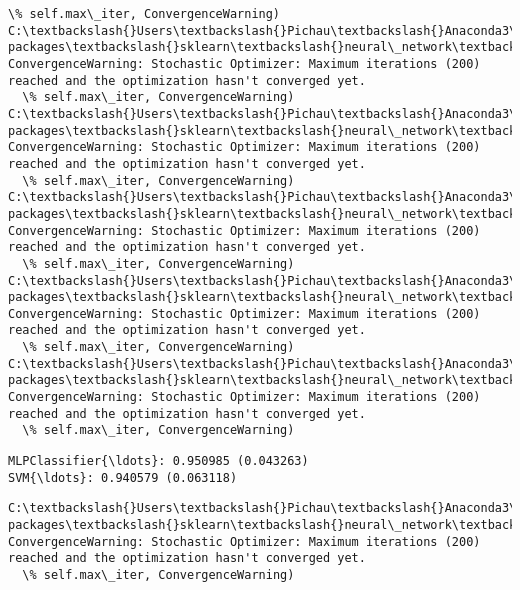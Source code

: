 \documentclass[11pt]{article}
\begin{document}
\begin{Verbatim}[commandchars=\\\{\}]
  \% self.max\_iter, ConvergenceWarning)
C:\textbackslash{}Users\textbackslash{}Pichau\textbackslash{}Anaconda3\textbackslash{}lib\textbackslash{}site-packages\textbackslash{}sklearn\textbackslash{}neural\_network\textbackslash{}multilayer\_perceptron.py:564: ConvergenceWarning: Stochastic Optimizer: Maximum iterations (200) reached and the optimization hasn't converged yet.
  \% self.max\_iter, ConvergenceWarning)
C:\textbackslash{}Users\textbackslash{}Pichau\textbackslash{}Anaconda3\textbackslash{}lib\textbackslash{}site-packages\textbackslash{}sklearn\textbackslash{}neural\_network\textbackslash{}multilayer\_perceptron.py:564: ConvergenceWarning: Stochastic Optimizer: Maximum iterations (200) reached and the optimization hasn't converged yet.
  \% self.max\_iter, ConvergenceWarning)
C:\textbackslash{}Users\textbackslash{}Pichau\textbackslash{}Anaconda3\textbackslash{}lib\textbackslash{}site-packages\textbackslash{}sklearn\textbackslash{}neural\_network\textbackslash{}multilayer\_perceptron.py:564: ConvergenceWarning: Stochastic Optimizer: Maximum iterations (200) reached and the optimization hasn't converged yet.
  \% self.max\_iter, ConvergenceWarning)
C:\textbackslash{}Users\textbackslash{}Pichau\textbackslash{}Anaconda3\textbackslash{}lib\textbackslash{}site-packages\textbackslash{}sklearn\textbackslash{}neural\_network\textbackslash{}multilayer\_perceptron.py:564: ConvergenceWarning: Stochastic Optimizer: Maximum iterations (200) reached and the optimization hasn't converged yet.
  \% self.max\_iter, ConvergenceWarning)
C:\textbackslash{}Users\textbackslash{}Pichau\textbackslash{}Anaconda3\textbackslash{}lib\textbackslash{}site-packages\textbackslash{}sklearn\textbackslash{}neural\_network\textbackslash{}multilayer\_perceptron.py:564: ConvergenceWarning: Stochastic Optimizer: Maximum iterations (200) reached and the optimization hasn't converged yet.
  \% self.max\_iter, ConvergenceWarning)

    \end{Verbatim}

    \begin{Verbatim}[commandchars=\\\{\}]
MLPClassifier{\ldots}: 0.950985 (0.043263)
SVM{\ldots}: 0.940579 (0.063118)

    \end{Verbatim}

    \begin{Verbatim}[commandchars=\\\{\}]
C:\textbackslash{}Users\textbackslash{}Pichau\textbackslash{}Anaconda3\textbackslash{}lib\textbackslash{}site-packages\textbackslash{}sklearn\textbackslash{}neural\_network\textbackslash{}multilayer\_perceptron.py:564: ConvergenceWarning: Stochastic Optimizer: Maximum iterations (200) reached and the optimization hasn't converged yet.
  \% self.max\_iter, ConvergenceWarning)

    \end{Verbatim}
\end{document}
